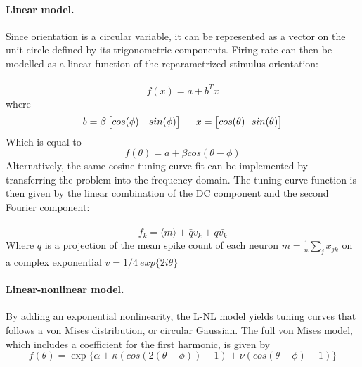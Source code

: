\documentclass[10pt]{article}
\begin{document}
\paragraph{Linear model.} Since orientation is a circular variable, it can be represented as a vector on the unit circle defined by its trigonometric components. Firing rate can then be modelled as a linear function of the reparametrized stimulus orientation: \\ \\
\begin{equation*}
f(x) = a+b^Tx
\end{equation*}
where 
\begin{align*}
b = \beta \begin{bmatrix}
cos (\phi) & sin (\phi )
 \end{bmatrix}  
 \hspace{5mm}
 x =  \begin{bmatrix}
cos (\theta) \ \
  sin (\theta)
 \end{bmatrix} 
\end{align*}
Which is equal to 
\begin{equation*}
f(\theta) = a+ \beta cos(\theta - \phi)
\end{equation*}
Alternatively, the same cosine tuning curve fit can be implemented by transferring the problem into the frequency domain. The tuning curve function is then given by the linear combination of the DC component and the second Fourier component: \\ \\
\begin{equation*}
f_k = \langle m \rangle + \bar{q} v_k + q \bar{v_k} 
\end{equation*}
Where $q$ is a projection of the mean spike count of each neuron $m = \frac{1}{n} \sum_j x_{jk}$ on a complex exponential $v = 1/4\ exp \{2i \theta\} $
\paragraph{Linear-nonlinear model.} By adding an exponential nonlinearity, the L-NL model yields tuning curves that follows a von Mises distribution, or circular Gaussian. The full von Mises model, which includes a coefficient for the first harmonic, is given by
\begin{equation*}
f(\theta) = \exp\{ \alpha+\kappa(cos(2(\theta-\phi))-1)+\nu(cos(\theta-\phi)-1)\}
\end{equation*}
\end{document}
